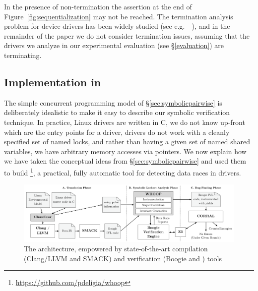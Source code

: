 In the presence of non-termination the assertion at the end of Figure~\ref{fig:sequentialization} may not be reached.  The termination analysis problem for device drivers has been widely studied (see e.g.\ ~\cite{cook2006termination}), and in the remainder of the paper we do not consider termination issues, assuming that the drivers we analyze in our experimental evaluation (see \S\ref{evaluation}) are terminating.

\subsection{Implementation in \whoop}
\label{sec:implementation}

The simple concurrent programming model of \S\ref{sec:symbolicpairwise} is deliberately idealistic to make it easy to describe our symbolic verification technique. In practice, Linux drivers are written in C, we do not know up-front which are the entry points for a driver, drivers do not work with a cleanly specified set of named locks, and rather than having a given set of named shared variables, we have arbitrary memory accesses via pointers. We now explain how we have taken the conceptual ideas from \S\ref{sec:symbolicpairwise} and used them to build \whoop\footnote{\url{https://github.com/pdeligia/whoop}}, a practical, fully automatic tool for detecting data races in drivers.

\begin{figure}
\centering
\includegraphics[width=.99\linewidth]{img/whoop.pdf}
\caption{The \whoop architecture, empowered by state-of-the-art compilation (Clang/LLVM and SMACK) and verification (Boogie and \corral) tools}
\label{fig:whoop}
\end{figure}

